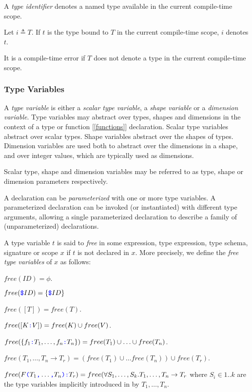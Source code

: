 \documentclass{article}
\begin{document}
A {\em type identifier} denotes a named type available in the current compile-time scope.

Let $i \triangleq T$. If $t$ is the type bound to $T$ in the current compile-time scope, $i$ denotes $t$. 

It is a compile-time error if $T$ does not denote a type in the current compile-time scope.

\subsubsection{Type Variables}
\label{typeVariables}

A {\em type variable} is either a {\em scalar type variable}, a {\em shape variable} or a {\em dimension variable}. Type variables may abstract over types, shapes and dimensions in the context of a type or function [\ref{functions}] declaration. Scalar type variables abstract over  scalar types. Shape variables abstract over the shapes of types. Dimension variables are used both to abstract over the dimensions in a shape, and over integer values, which are typically used as dimensions.

Scalar type, shape and dimension variables may be referred to as type, shape or dimension parameters respectively.

 A declaration can be {\em parameterized} with one or more type variables. A parameterized declaration can be invoked (or instantiated) with different type arguments, allowing a single parameterized declaration to describe a family of (unparameterized) declarations. 
 
 A type variable $t$ is said to {\em free} in some expression, type expression, type schema, signature or scope $x$ if $t$ is not declared in $x$.  More precisely, we define the {\em free type variables} of $x$ as follows:
 
 $free(ID) = \phi$.
 
 $free(\texttt{\color{blue} \$}{}ID) = \{\texttt{\color{blue} \$}{}ID\}$ 
 
 $free([T]) = free(T)$.
 
 $free([K \texttt{\color{blue} :}{} V]) = free(K) \cup free(V)$.
 
 $free(\{f_1\texttt{\color{blue} :}{} T_1, \ldots, f_n\texttt{\color{blue} :}{} T_n\}) =  free(T_1) \cup \ldots \cup free(T_n)$.
 
 $free(T_1, \ldots, T_n \to T_r) = (free(T_1) \cup \ldots free(T_n)) \cup free(T_r)$. 
 
 $free(F\texttt{\color{blue} (}{} T_1\texttt{\color{blue} ,}{} \ldots\texttt{\color{blue} ,}{} T_n\texttt{\color{blue} )}\texttt{\color{blue} :}{}T_r) = free(\forall S_1, \ldots, S_k. T_1, \ldots, T_n \to T_r$ where $S_i \in 1..k$ are the type variables implicitly introduced in by $T_1, \ldots, T_n$.
 
\end{document}

